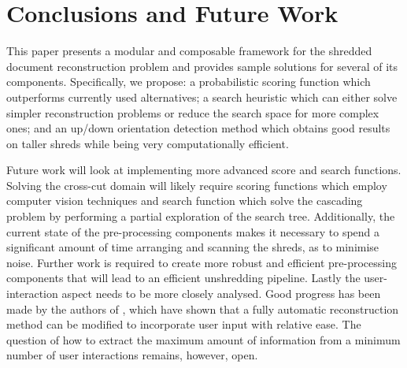 \documentclass{llncs}
\begin{document}
\section{Conclusions and Future Work}
This paper presents a modular and composable framework for the shredded document reconstruction problem and provides sample solutions for several of its components. Specifically, we propose: a probabilistic scoring function which outperforms currently used alternatives; a search heuristic which can either solve simpler reconstruction problems or reduce the search space for more complex ones; and an up/down orientation detection method which obtains good results on taller shreds while being very computationally efficient.

Future work will look at implementing more advanced score and search functions. Solving the cross-cut domain will likely require scoring functions which employ computer vision techniques and search function which solve the cascading problem by performing a partial exploration of the search tree. Additionally, the current state of the pre-processing components makes it necessary to spend a significant amount of time arranging and scanning the shreds, as to minimise noise. Further work is required to create more robust and efficient pre-processing components that will lead to an efficient unshredding pipeline. Lastly the user-interaction aspect needs to be more closely analysed. Good progress has been made by the authors of \cite{P1,P5}, which have shown that a fully automatic reconstruction method can be modified to incorporate user input with relative ease. The question of how to extract the maximum amount of information from a minimum number of user interactions remains, however, open.



\end{document}
